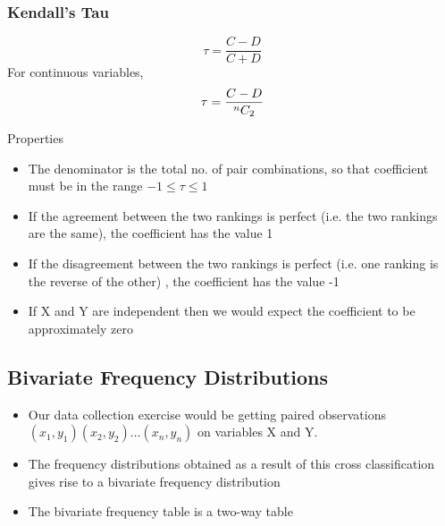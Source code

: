 \documentclass[
10pt, %
a4paper, %
]{report}
\begin{document}
\subsubsection{Kendall's Tau}
\[
\tau = \frac{C-D}{C+D}
\]
For continuous variables,
\[
\tau = \frac{C-D}{{}^{n}C_{2}}
\]

Properties
\begin{itemize}
\item The denominator is the total no. of pair combinations, so that
coefficient must be in the range \(-1\le\tau\le1\)
\item If the agreement between the two rankings is perfect (i.e. the two rankings are the same), the coefficient has the value 1
\item If the disagreement between the two rankings is perfect (i.e. one ranking is the reverse of the other) , the coefficient has the value -1
\item If X and Y are independent then we would expect the coefficient to be approximately zero
\end{itemize}

\subsection{Bivariate Frequency Distributions}
\begin{itemize}
\item Our data collection exercise would be getting paired observations \((x_1, y_1) (x_2, y_2) \dots (x_n, y_n)\) on variables X and Y.
\item The frequency distributions obtained as a result of this cross classification gives rise to a bivariate frequency distribution
\item The bivariate frequency table is a two-way table
\end{itemize}
\end{document}
